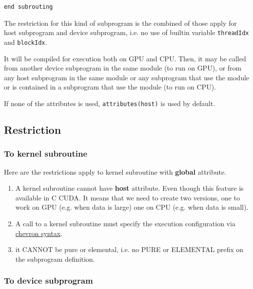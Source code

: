 \begin{enumerate}
\begin{lstlisting}
end subrouting
\end{lstlisting}
  The restriction for this kind of subprogram is the combined of those
  apply for host subprogram and device subprogram, i.e. no use of
  builtin variable \verb!threadIdx! and \verb!blockIdx!.

  It will be compiled for execution both on GPU and CPU. Then, it may
  be called from another device subprogram in the same module (to run
  on GPU), or from any host subprogram in the same module or any
  subprogram that use the module or is contained in a subprogram that
  use the module (to run on CPU). 

\end{enumerate}

\begin{framed}
  If none of the attributes is used, \verb!attributes(host)! is used
  by default.
\end{framed}

\subsection{Restriction}
\label{sec:restriction}

\subsubsection{To kernel subroutine}
\label{sec:kernel-subroutine}

Here are the restrictions apply to kernel subroutine with {\bf global}
attribute. 
\begin{enumerate}
\item A kernel subroutine cannot have {\bf host} attribute. Even
  though this feature is available in C CUDA. It means that we need to
  create two versions, one to work on GPU (e.g. when data is large)
  one on CPU (e.g. when data is small). 

\item A call to a kernel subroutine must specify the execution
  configuration via \hyperref[sec:call-kernel]{chevron syntax}.
\item it CANNOT be pure or elemental, i.e. no PURE or ELEMENTAL prefix
  on the subprogram definition.
\end{enumerate}

\subsubsection{To device subprogram}
\label{sec:device-subprogram}


